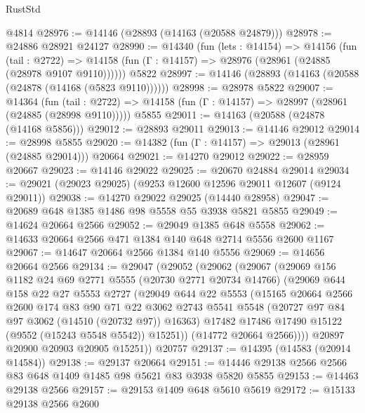 \begin{lexlean}{RustStd}
\begin{coremodule}
    @4814
@28976 := @14146 (@28893 (@14163 (@20588 @24879)))
@28978 := @24886 @28921 @24127
@28990 := @14340
    (fun (lets : @14154) =>
    @14156
      (fun (tail : @2722) =>
      @14158 (fun (Γ : @14157) => @28976 (@28961 (@24885 (@28978 @9107 @9110))))))
    @5822
@28997 := @14146 (@28893 (@14163 (@20588 (@24878 (@14168 (@5823 @9110))))))
@28998 := @28978 @5822
@29007 := @14364
    (fun (tail : @2722) => @14158 (fun (Γ : @14157) => @28997 (@28961 (@24885 (@28998 @9110)))))
    @5855
@29011 := @14163 (@20588 (@24878 (@14168 @5856)))
@29012 := @28893 @29011
@29013 := @14146 @29012
@29014 := @28998 @5855
@29020 := @14382 (fun (Γ : @14157) => @29013 (@28961 (@24885 @29014))) @20664
@29021 := @14270 @29012
@29022 := @28959 @20667
@29023 := @14146 @29022
@29025 := @20670 @24884 @29014
@29034 := @29021 (@29023 @29025) (@9253 @12600 @12596 @29011 @12607 (@9124 @29011))
@29038 := @14270 @29022 @29025 (@14440 @28958)
@29047 := @20689 @648 @1385 @1486 @98 @5558 @55 @3938 @5821 @5855
@29049 := @14624 @20664 @2566
@29052 := @29049 @1385 @648 @5558
@29062 := @14633 @20664 @2566 @471 @1384 @140 @648 @2714 @5556 @2600 @1167
@29067 := @14647 @20664 @2566 @1384 @140 @5556
@29069 := @14656 @20664 @2566
@29134 := @29047
    (@29052
      (@29062
        (@29067
          (@29069
            @156
            @1182
            @24
            @69
            @2771
            @5555
            (@20730 @2771 @20734 @14766)
            (@29069
              @644
              @158
              @22
              @27
              @5553
              @2727
              (@29049
                @644
                @22
                @5553
                (@15165
                  @20664
                  @2566
                  @2600
                  @174
                  @83
                  @90
                  @71
                  @22
                  @3062
                  @2743
                  @5541
                  @5548
                  (@20727 @97 @84 @97 @3062 (@14510 (@20732 @97)) @16363)
                  @17482
                  @17486
                  @17490
                  @15122
                  (@9552 (@15243 @5548 @5542))
                  @15251))
              (@14772 @20664 @2566))))
        @20897
        @20900
        @20903
        @20905
        @15251))
    @20757
@29137 := @14395 (@14583 (@20914 @14584))
@29138 := @29137 @20664
@29151 := @14446 @29138 @2566 @2566 @83 @648 @1409 @1485 @98 @5621 @83 @3938 @5820 @5855
@29153 := @14463 @29138 @2566
@29157 := @29153 @1409 @648 @5610 @5619
@29172 := @15133
    @29138
    @2566
    @2600

\end{coremodule}
\end{lexlean}
